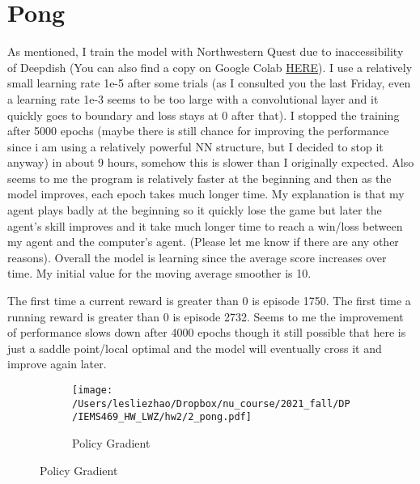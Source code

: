 \documentclass[12pt,letterpaper]{article}
\begin{document}
\section{Pong}
As mentioned, I train the model with Northwestern Quest due to inaccessibility of Deepdish (You can also find a copy on Google Colab \href{https://colab.research.google.com/drive/1P2JLPoPdEyRfwSj1ebTzGk2u2wVtkD0G?usp=sharing}{HERE}). I use a relatively small learning rate 1e-5 after some trials (as I consulted you the last Friday, even a learning rate 1e-3 seems to be too large with a convolutional layer and it quickly goes to boundary and loss stays at 0 after that). I stopped the training after 5000 epochs (maybe there is still chance for improving the performance since i am using a relatively powerful NN structure, but I decided to stop it anyway) in about 9 hours, somehow this is slower than I originally expected. Also seems to me the program is relatively faster at the beginning and then as the model improves, each epoch takes much longer time. My explanation is that my agent plays badly at the beginning so it quickly lose the game but later the agent's skill improves and it take much longer time to reach a win/loss between my agent and the computer's agent. (Please let me know if there are any other reasons). Overall the model is learning since the average score increases over time. My initial value for the moving average smoother is 10.

The first time a current reward is greater than 0 is episode 1750. The first time a running reward is greater than 0 is episode 2732. Seems to me the improvement of performance slows down after 4000 epochs though it still possible that here is just a saddle point/local optimal and the model will eventually cross it and improve again later. 
 \begin{figure}[H]
	\centering
	\caption{Pong game}
	\begin{subfigure}[h]{0.9\textwidth}
		\centering
		\texttt{[image: /Users/lesliezhao/Dropbox/nu\_course/2021\_fall/DP/IEMS469\_HW\_LWZ/hw2/2\_pong.pdf]}
		\caption{Policy Gradient}
	\end{subfigure}
\end{figure}
\end{document}
